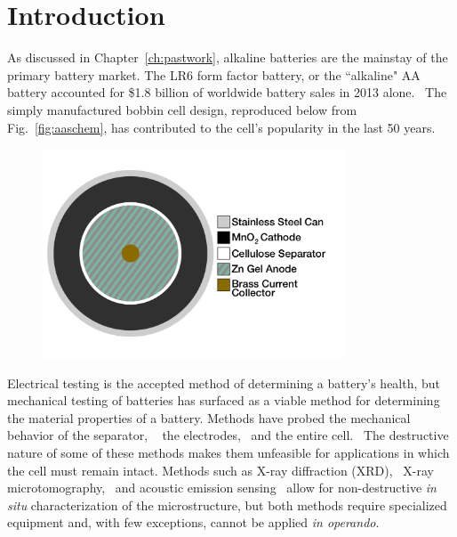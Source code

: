 \section{Introduction}
\label{sec:dbb:intro}

As discussed in Chapter~\ref{ch:pastwork}, alkaline batteries are the mainstay of the primary battery market. The LR6 form factor {} battery, or the ``alkaline" AA battery accounted for \$1.8 billion of worldwide battery sales in 2013 alone.~\cite{highbeam,ibisworld} The simply manufactured bobbin cell design, reproduced below from Fig.~\ref{fig:aaschem}, has contributed to the cell's popularity in the last 50 years.~\cite{karl_patent}

\begin{figure}[htb]
  \centering
    \includegraphics[width=0.80\textwidth]{ch3-dbb/Images/aaschem.png}
\end{figure}

Electrical testing is the accepted method of determining a battery's health, but mechanical testing of batteries has surfaced as a viable method for determining the material properties of a battery. Methods have probed the mechanical behavior of the separator, ~\cite{cannarella_ion,peabody_separator} the electrodes,~\cite{chen,du_cycling,han,park,striebel} and the entire cell.~\cite{cannarella_stress} The destructive nature of some of these methods makes them unfeasible for applications in which the cell must remain intact. Methods such as X-ray diffraction (XRD),~\cite{gallaway} X-ray microtomography,~\cite{haibel,Manke2007-yj,ebner} and acoustic emission sensing~\cite{etiemble,kalnaus,kircheva,rhodes} allow for non-destructive \textit{in situ} characterization of the microstructure, but both methods require specialized equipment and, with few exceptions, cannot be applied \textit{in operando}.

